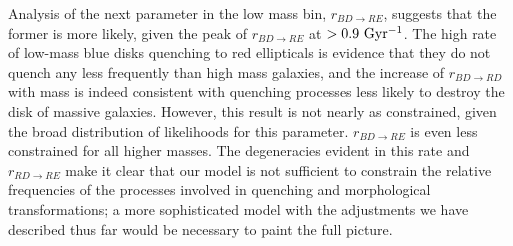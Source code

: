 \documentclass[useAMS,usenatbib]{mn2e}
\begin{document}
 Analysis of the next parameter in the low mass bin, $r_{BD\rightarrow RE}$, suggests that the former is more likely, given the peak of $r_{BD \rightarrow RE}$ at $>0.9 ~\rm Gyr^{-1}$. The high rate of low-mass blue disks quenching to red ellipticals is evidence that they do not quench any less frequently than high mass galaxies, and the increase of $r_{BD \rightarrow RD}$ with mass is indeed consistent with quenching processes less likely to destroy the disk of massive galaxies. However, this result is not nearly as constrained, given the broad distribution of likelihoods for this parameter. $r_{BD \rightarrow RE}$ is even less constrained for all higher masses. The degeneracies evident in this rate and $r_{RD \rightarrow RE}$ make it clear that our model is not sufficient to constrain the relative frequencies of the processes involved in quenching and morphological transformations; a more sophisticated model with the adjustments we have described thus far would be necessary to paint the full picture. 
\end{document}
